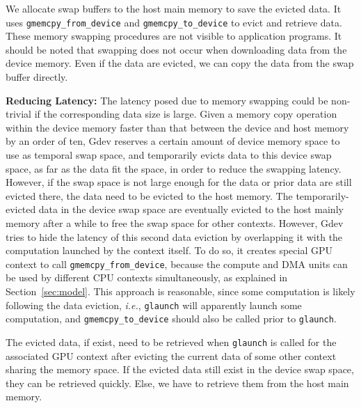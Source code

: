We allocate swap buffers to the host main memory to save the evicted
data.
It uses \texttt{gmemcpy\_from\_device} and \texttt{gmemcpy\_to\_device}
to evict and retrieve data.
These memory swapping procedures are not visible to application programs.
It should be noted that swapping does not occur when downloading data
from the device memory.
Even if the data are evicted, we can copy the data from the swap buffer
directly.

\textbf{Reducing Latency:}
The latency posed due to memory swapping could be non-trivial if the
corresponding data size is large.
Given a memory copy operation within the device memory faster than
that between the device and host memory by an order of ten, Gdev
reserves a certain amount of device memory space to use as temporal swap
space, and temporarily evicts data to this device swap space, as far as
the data fit the space, in order to reduce the swapping latency.
However, if the swap space is not large enough for the data or prior
data are still evicted there, the data need to be evicted to the host
memory.
The temporarily-evicted data in the device swap space are eventually
evicted to the host mainly memory after a while to free the swap space
for other contexts.
However, Gdev tries to hide the latency of this second data eviction by
overlapping it with the computation launched by the context itself.
To do so, it creates special GPU context to call
\texttt{gmemcpy\_from\_device}, because the compute and DMA units can be
used by different CPU contexts simultaneously, as explained in
Section~\ref{sec:model}.
This approach is reasonable, since some computation is likely following
the data eviction, \textit{i.e.}, \texttt{glaunch} will apparently
launch some computation, and \texttt{gmemcpy\_to\_device} should also be
called prior to \texttt{glaunch}.

The evicted data, if exist, need to be retrieved when \texttt{glaunch}
is called for the associated GPU context after evicting the current data
of some other context sharing the memory space.
If the evicted data still exist in the device swap space, they can be
retrieved quickly.
Else, we have to retrieve them from the host main memory.
